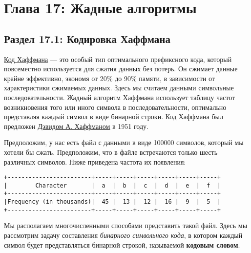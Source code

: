 \chapter*{Глава 17: Жадные алгоритмы}

\vspace{\baselineskip}
\section*{Раздел 17.1: Кодировка Хаффмана}

\vspace{\baselineskip}
\href{https://vk.cc/atQr71}{\underline{Код Хаффмана}} --- это особый тип оптимального префиксного кода, который повсеместно используется для сжатия данных без потерь. Он сжимает данные крайне эффективно, экономя от 20\% до 90\% памяти, в зависимости от характеристики сжимаемых данных. Здесь мы считаем данными символьные последовательности. Жадный алгоритм Хаффмана использует таблицу частот возникновения того или иного символа в последовательности, оптимально представляя каждый символ в виде бинарной строки. Код Хаффмана был предложен \href{https://vk.cc/atQreq}{\underline{Дэвидом А. Хаффманом}} в 1951 году.  

\vspace{\baselineskip}
Предположим, у нас есть файл с данными в виде 100000 символов, который мы хотели бы сжать. Предположим, что в файле встречаются только шесть различных символов. Ниже приведена частота их появления: 

\vspace{\baselineskip}
\begin{tcolorbox}
\begin{verbatim}
+------------------------+-----+-----+-----+-----+-----+-----+
|        Character       |  a  |  b  |  c  |  d  |  e  |  f  |
+------------------------+-----+-----+-----+-----+-----+-----+
|Frequency (in thousands)|  45 |  13 |  12 |  16 |  9  |  5  |
+------------------------+-----+-----+-----+-----+-----+-----+
\end{verbatim}
\end{tcolorbox}


\vspace{\baselineskip}
Мы располагаем многочисленными способами представить такой файл. Здесь мы рассмотрим задачу составления {\itshape бинарного символьного кода}, в котором каждый символ будет представляться бинарной строкой, называемой \textbf{
кодовым словом}. 


